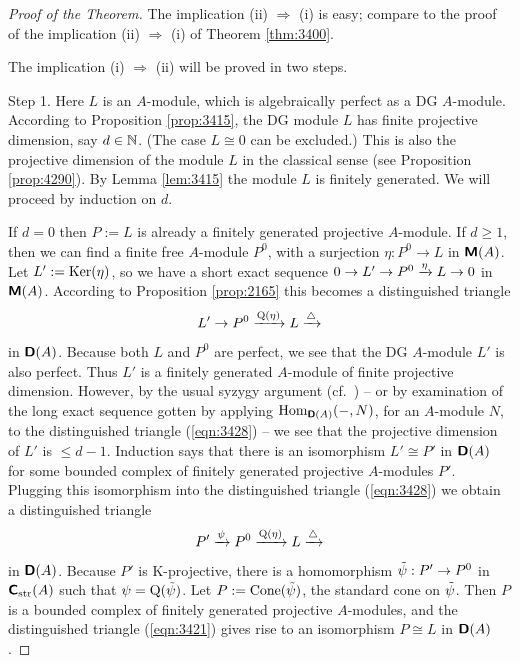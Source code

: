 \begin{proof}[Proof of the Theorem]
The implication (ii) $\Rightarrow$ (i) is easy; compare to the proof of the 
implication (ii) $\Rightarrow$ (i) of Theorem \ref{thm:3400}.

The implication (i) $\Rightarrow$ (ii) will be proved in two steps. 

\smallskip \noindent
Step 1. Here $L$ is an $A$-module, which is algebraically perfect as a DG 
$A$-module. According to Proposition \ref{prop:3415}, the DG module $L$ has 
finite projective dimension, say $d \in \mathbb{N}$. (The case $L \cong 0$ can be 
excluded.) This is also the projective dimension of the module $L$ in the 
classical sense (see Proposition \ref{prop:4290}). 
By Lemma \ref{lem:3415} the module $L$ is finitely generated. 
We will proceed by induction on $d$. 

If $d = 0$ then $P := L$ is already a finitely generated projective $A$-module. 
If $d \geq 1$, then we can find a finite free $A$-module $P^0$, with a 
surjection $\eta : P^0 \to L$ in $\boldsymbol{\mathsf{M}}(A)$. Let 
$L' := \operatorname{Ker}(\eta)$, so we have a short exact sequence 
$0 \to L' \to P^0 \xrightarrow{\eta} L \to 0$
in $\boldsymbol{\mathsf{M}}(A)$. 
According to Proposition \ref{prop:2165} this becomes a distinguished triangle 
\begin{equation} \label{eqn:3428}
L' \to P^0 \xrightarrow{\operatorname{Q}(\eta)} L \xrightarrow{\triangle}
\end{equation}
in $\boldsymbol{\mathsf{D}}(A)$.
Because both $L$ and $P^0$ are perfect, we see that the DG $A$-module $L'$ is 
also perfect. Thus $L'$ is a finitely generated $A$-module of finite 
projective dimension. However, by the usual syzygy argument 
(cf.\ \cite[Section 5.1.1]{Row}) -- or by examination of the long exact 
sequence gotten by applying 
$\operatorname{Hom}_{\boldsymbol{\mathsf{D}}(A)}(-, N)$, for an $A$-module $N$, 
to the distinguished triangle (\ref{eqn:3428}) -- we see that 
the projective dimension of $L'$ is $\leq d - 1$. Induction says 
that there is an isomorphism $L' \cong P'$ in $\boldsymbol{\mathsf{D}}(A)$ for some bounded 
complex of finitely generated projective $A$-modules $P'$.
Plugging this isomorphism into the distinguished triangle (\ref{eqn:3428})
we obtain a distinguished triangle 
\begin{equation} \label{eqn:3421}
P' \xrightarrow{\psi} P^0 \xrightarrow{\operatorname{Q}(\eta)} L \xrightarrow{\triangle} 
\end{equation}
in $\boldsymbol{\mathsf{D}}(A)$. Because $P'$ is K-projective, there is a homomorphism 
$\tilde{\psi} : P' \to P^0$ in $\boldsymbol{\mathsf{C}}_{\mathrm{str}}(A)$ such that 
$\psi = \operatorname{Q}(\tilde{\psi})$. Let 
$P := \operatorname{Cone}(\tilde{\psi})$, the standard cone on $\tilde{\psi}$. 
Then $P$ is a bounded complex of finitely generated projective $A$-modules, and 
the distinguished triangle (\ref{eqn:3421}) gives rise to an isomorphism 
$P \cong L$ in $\boldsymbol{\mathsf{D}}(A)$.


\end{proof}
